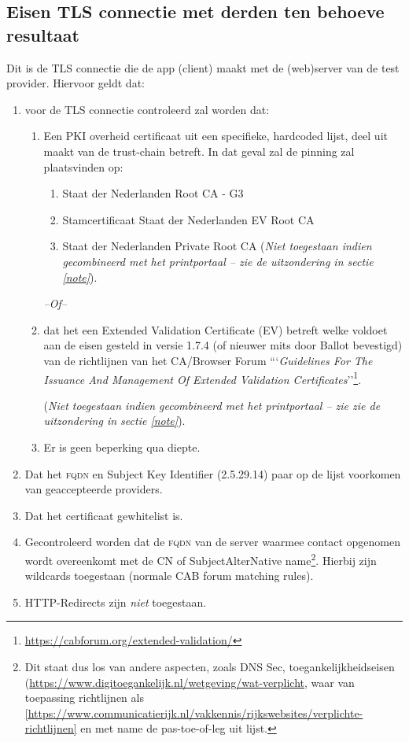\documentclass[11.0pt,twoside,openright]{report}
\begin{document}
\subsection{Eisen TLS connectie met derden ten behoeve resultaat}
\label{tlstest}

Dit is de TLS connectie die de app (client) maakt met de (web)server van de test provider. Hiervoor geldt dat:

\begin{enumerate}
\item voor de TLS connectie controleerd zal worden dat: 
\begin{enumerate}
\item Een PKI overheid certificaat uit een specifieke, hardcoded lijst, deel uit maakt van de trust-chain betreft. In dat geval zal de pinning zal plaatsvinden op:
\begin{enumerate}
\item Staat der Nederlanden Root CA - G3
\item Stamcertificaat Staat der Nederlanden EV Root CA 
\item Staat der Nederlanden Private Root CA (\emph{Niet toegestaan indien gecombineerd met het printportaal -- zie de uitzondering in sectie \ref{note}}).\label{priv}
\end{enumerate}

\emph{--Of--}

\item  dat het een Extended Validation Certificate (EV) betreft welke voldoet aan de eisen gesteld in versie 1.7.4 (of nieuwer mits door Ballot bevestigd) van de richtlijnen van het CA/Browser Forum ```\emph{Guidelines For The Issuance And Management Of Extended Validation Certificates}''\footnote{\url{https://cabforum.org/extended-validation/}}.

(\emph{Niet toegestaan indien gecombineerd met het printportaal -- zie zie de uitzondering in sectie \ref{note}}).
\label{cab}
\item Er is geen beperking qua diepte.
\end{enumerate}

\item   Dat het \textsc{fqdn} en Subject Key Identifier (2.5.29.14) paar op de lijst voorkomen van geaccepteerde providers.
\item 	Dat het certificaat gewhitelist is.
\item 	Gecontroleerd worden dat de \textsc{fqdn} van de server waarmee contact opgenomen wordt overeenkomt met de CN of SubjectAlterNative name\footnote{Dit staat dus los van andere aspecten, zoals DNS Sec, toegankelijkheidseisen (\url{https://www.digitoegankelijk.nl/wetgeving/wat-verplicht}, waar van toepassing richtlijnen als \ref{https://www.communicatierijk.nl/vakkennis/rijkswebsites/verplichte-richtlijnen} en met name de pas-toe-of-leg uit lijst.}. Hierbij zijn wildcards toegestaan (normale CAB forum matching rules).
\item HTTP-Redirects zijn \emph{niet} toegestaan.
\end{enumerate}
\end{document}
